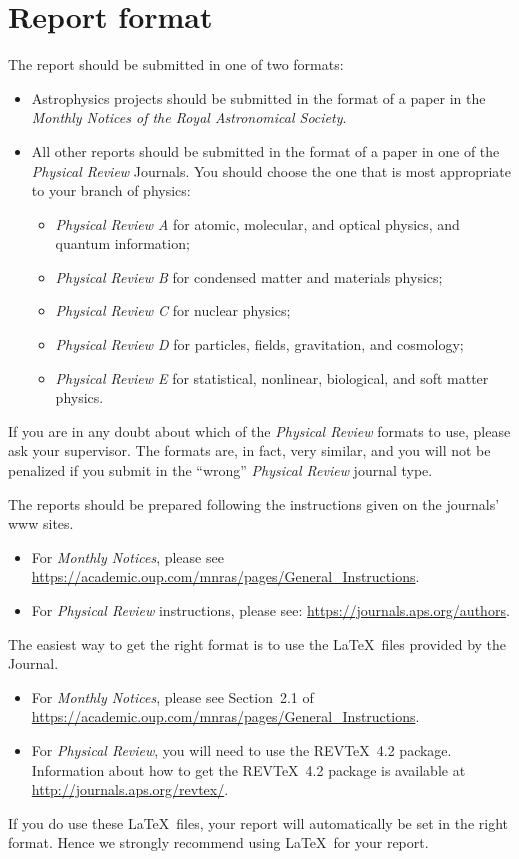 \documentclass[aps,pra,twocolumn]{revtex4-2}
\begin{document}
\section{Report format}
\label{sec:format}

The report should be submitted in one of two formats:
\begin{itemize}
\item Astrophysics projects should be submitted in the format of a paper in the \textit{Monthly Notices of the Royal Astronomical Society}.
\item All other reports should be submitted in the format of a paper in one of the \textit{Physical Review} Journals. You should choose the one that is most appropriate to your branch of physics:
\begin{itemize}
\item \textit{Physical Review A} for atomic, molecular, and optical physics, and quantum information;
\item \textit{Physical Review B} for condensed matter and materials physics;
\item \textit{Physical Review C} for nuclear physics;
\item \textit{Physical Review D} for particles, fields, gravitation, and cosmology;
\item \textit{Physical Review E} for statistical, nonlinear, biological, and soft matter physics.
\end{itemize}
\end{itemize}
If you are in any doubt about which of the \textit{Physical Review} formats to use, please ask your supervisor. The formats are, in fact, very similar, and you will not be penalized if you submit in the ``wrong''  \textit{Physical Review}  journal type.


The reports should be prepared following the instructions given on the journals' www sites.
\begin{itemize}
\item For \textit{Monthly Notices}, please see \url{https://academic.oup.com/mnras/pages/General_Instructions}.
\item For \textit{Physical Review} instructions, please see: \url{https://journals.aps.org/authors}.
\end{itemize}
The easiest way to get the right format is to use the \LaTeX\  files provided by the Journal.
\begin{itemize}
\item For \textit{Monthly Notices}, please see Section~2.1 of \url{https://academic.oup.com/mnras/pages/General_Instructions}. 
\item For \textit{Physical Review}, you  will need to use the REV\TeX~4.2 package. Information about how to get the REV\TeX~4.2 package is available at \url{http://journals.aps.org/revtex/}.
\end{itemize}
 If you do use these \LaTeX\ files, your report will automatically be set in the right format. Hence we strongly recommend using \LaTeX\ for your report.
 
\end{document}

